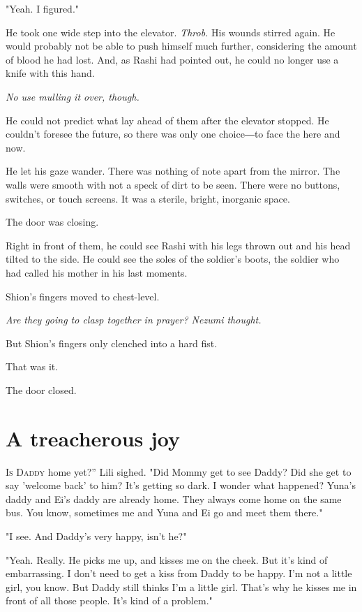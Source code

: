 "Yeah. I figured."

He took one wide step into the elevator. \emph{Throb.} His wounds stirred
again. He would probably not be able to push himself much further,
considering the amount of blood he had lost. And, as Rashi had pointed
out, he could no longer use a knife with this hand.

\emph{No use mulling it over, though.}

He could not predict what lay ahead of them after the elevator stopped.
He couldn't foresee the future, so there was only one choice―to face the
here and now.

He let his gaze wander. There was nothing of note apart from the mirror.
The walls were smooth with not a speck of dirt to be seen. There were no
buttons, switches, or touch screens. It was a sterile, bright, inorganic
space.

The door was closing.

Right in front of them, he could see Rashi with his legs thrown out and
his head tilted to the side. He could see the soles of the soldier's
boots, the soldier who had called his mother in his last moments.

Shion's fingers moved to chest-level.

\emph{Are they going to clasp together in prayer? Nezumi thought.}

But Shion's fingers only clenched into a hard fist.

That was it.

The door closed.

\chapter{A treacherous joy}


\lettrine[ante=``]{I}{s Daddy} home yet?'' Lili sighed. "Did Mommy get to see Daddy? Did she
get to say 'welcome back' to him? It's getting so dark. I wonder what
happened? Yuna's daddy and Ei's daddy are already home. They always come
home on the same bus. You know, sometimes me and Yuna and Ei go and meet
them there."

"I see. And Daddy's very happy, isn't he?"

"Yeah. Really. He picks me up, and kisses me on the cheek. But it's kind
of embarrassing. I don't need to get a kiss from Daddy to be happy. I'm
not a little girl, you know. But Daddy still thinks I'm a little girl.
That's why he kisses me in front of all those people. It's kind of a
problem."

